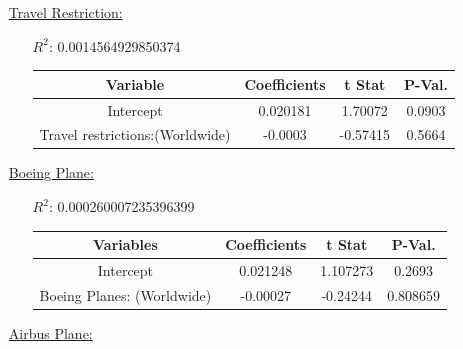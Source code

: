 \documentclass[12pt]{report}
\begin{document}
\begin{enumerate}

 \setlength{\itemsep}{1.5cm}

    \item[\underline{Travel Restriction:}]
        \begin{enumerate}
            \item[$R^2$:]0.0014564929850374
            \item[]
                \begin{tabular}{|c|c|c|c|}
                          \toprule \hline
                          \textbf{Variable} & \textbf{Coefficients} & \textbf{t Stat} & \textbf{P-Val.}\\ \hline
                          Intercept & 0.020181 & 1.70072 &0.0903 \\ \hline
                          Travel restrictions:(Worldwide) & -0.0003 & -0.57415 &0.5664 \\ \hline
                          \bottomrule





                \end{tabular}




        \end{enumerate}

    \item[\underline{Boeing Plane:}]
        \begin{enumerate}
            \item[$R^2$:]0.000260007235396399
            \item[]
                 \begin{tabular}{|c|c|c|c|}

        \toprule \hline
        \textbf{Variables} & \textbf{Coefficients}  & \textbf{t Stat}& \textbf{P-Val.} \\ \hline

        Intercept & 0.021248 &  1.107273 &0.2693 \\ \hline
        Boeing Planes: (Worldwide) & -0.00027 &  -0.24244 &0.808659\\ \hline
        \bottomrule

                \end{tabular}




        \end{enumerate}

    \item[\underline{Airbus Plane:}]
 \begin{samepage}


\end{samepage}
\end{enumerate}
\end{document}
